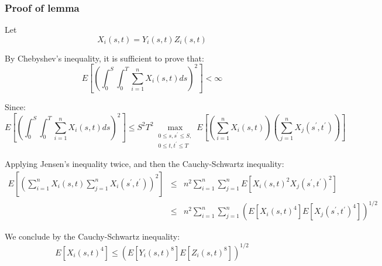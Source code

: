 \documentclass{article}
\begin{document}

\subsubsection{Proof of lemma}

Let%
\begin{equation*}
X_{i}(s,t)=Y_{i}(s,t)Z_{i}(s,t)
\end{equation*}

By Chebyshev's inequality, it is sufficient to prove that:%
\begin{equation*}
E[(\int_{0}^{S}\int_{0}^{T}\sum_{i=1}^{n}X_{i}(s,t)ds)^{2}]<\infty
\end{equation*}

Since:%
\begin{equation*}
E[(\int_{0}^{S}\int_{0}^{T}\sum_{i=1}^{n}X_{i}(s,t)ds)^{2}]\leq
S^{2}T^{2}\max_{\substack{ 0\leq s,s^{\prime }\leq S,  \\ 0\leq t,t^{\prime
}\leq T}}E[(\sum_{i=1}^{n}X_{i}(s,t))(\sum_{j=1}^{n}X_{j}(s^{\prime
},t^{\prime }))]
\end{equation*}%
\bigskip

Applying Jensen's inequality twice, and then the Cauchy-Schwartz inequality:%
\begin{eqnarray*}
E[(\sum_{i=1}^{n}X_{i}(s,t)\sum_{j=1}^{n}X_{i}(s^{\prime },t^{\prime
}))^{2}] &\leq
&n^{2}\sum_{i=1}^{n}\sum_{j=1}^{n}E[X_{i}(s,t)^{2}X_{j}(s^{\prime
},t^{\prime })^{2}] \\
&\leq &n^{2}\sum_{i=1}^{n}\sum_{j=1}^{n}(E[X_{i}(s,t)^{4}]E[X_{j}(s^{\prime
},t^{\prime })^{4}])^{1/2}
\end{eqnarray*}

We conclude by the Cauchy-Schwartz inequality:%
\begin{equation*}
E[X_{i}(s,t)^{4}]\leq (E[Y_{i}(s,t)^{8}]E[Z_{i}(s,t)^{8}])^{1/2}
\end{equation*}%
\bigskip
\end{document}
